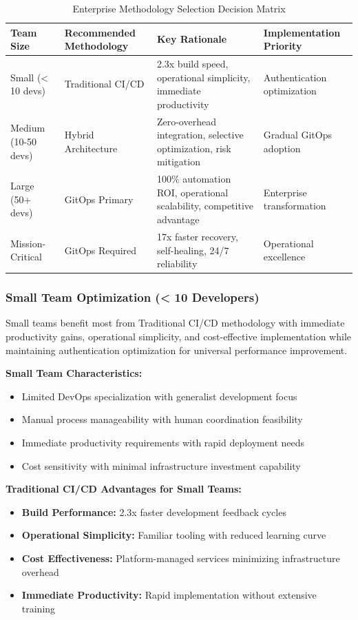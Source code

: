 \begin{table}[H]
\centering
\caption{Enterprise Methodology Selection Decision Matrix}
\label{tab:decision_matrix}
\begin{tabular}{|p{2.5cm}|p{3.5cm}|p{3.5cm}|p{4cm}|}
\hline
\textbf{Team Size} & \textbf{Recommended Methodology} & \textbf{Key Rationale} & \textbf{Implementation Priority} \\
\hline
Small (< 10 devs) & Traditional CI/CD & 2.3x build speed, operational simplicity, immediate productivity & Authentication optimization \\
\hline
Medium (10-50 devs) & Hybrid Architecture & Zero-overhead integration, selective optimization, risk mitigation & Gradual GitOps adoption \\
\hline
Large (50+ devs) & GitOps Primary & 100\% automation ROI, operational scalability, competitive advantage & Enterprise transformation \\
\hline
Mission-Critical & GitOps Required & 17x faster recovery, self-healing, 24/7 reliability & Operational excellence \\
\hline
\end{tabular}
\end{table}

\subsubsection{Small Team Optimization (< 10 Developers)}

Small teams benefit most from Traditional CI/CD methodology with immediate productivity gains, operational simplicity, and cost-effective implementation while maintaining authentication optimization for universal performance improvement.

\textbf{Small Team Characteristics:}
\begin{itemize}
\item Limited DevOps specialization with generalist development focus
\item Manual process manageability with human coordination feasibility
\item Immediate productivity requirements with rapid deployment needs
\item Cost sensitivity with minimal infrastructure investment capability
\end{itemize}

\textbf{Traditional CI/CD Advantages for Small Teams:}
\begin{itemize}
\item \textbf{Build Performance:} 2.3x faster development feedback cycles
\item \textbf{Operational Simplicity:} Familiar tooling with reduced learning curve
\item \textbf{Cost Effectiveness:} Platform-managed services minimizing infrastructure overhead
\item \textbf{Immediate Productivity:} Rapid implementation without extensive training
\end{itemize}

